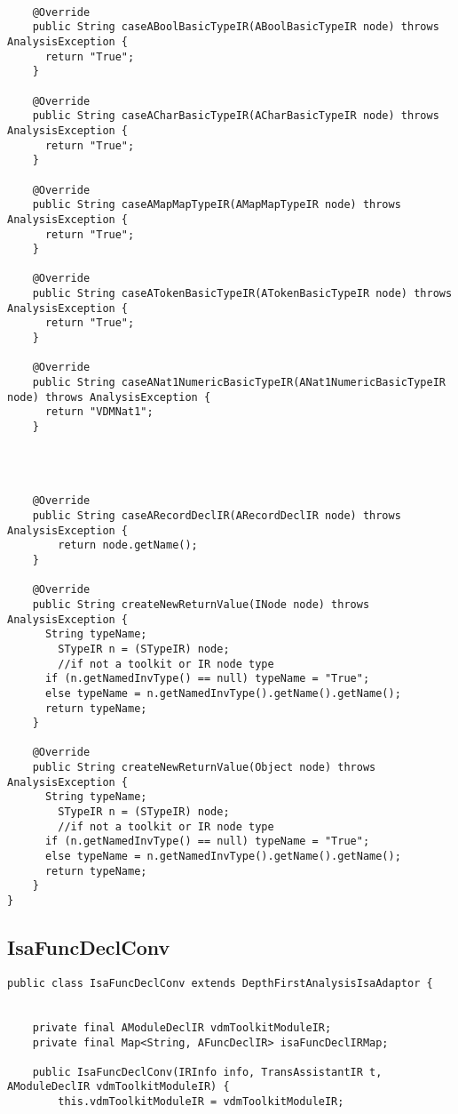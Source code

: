 \begin{appendices}
\begin{lstlisting}
    
    @Override
    public String caseABoolBasicTypeIR(ABoolBasicTypeIR node) throws AnalysisException {
      return "True";
    }
    
    @Override
    public String caseACharBasicTypeIR(ACharBasicTypeIR node) throws AnalysisException {
      return "True";
    }
    
    @Override
    public String caseAMapMapTypeIR(AMapMapTypeIR node) throws AnalysisException {
      return "True";
    }
    
    @Override
    public String caseATokenBasicTypeIR(ATokenBasicTypeIR node) throws AnalysisException {
      return "True";
    }
    
    @Override
    public String caseANat1NumericBasicTypeIR(ANat1NumericBasicTypeIR node) throws AnalysisException {
      return "VDMNat1";
    }
    
    
    
    
    @Override
    public String caseARecordDeclIR(ARecordDeclIR node) throws AnalysisException {
        return node.getName();
    }

    @Override
    public String createNewReturnValue(INode node) throws AnalysisException {
      String typeName;
        STypeIR n = (STypeIR) node;
        //if not a toolkit or IR node type
      if (n.getNamedInvType() == null) typeName = "True";
      else typeName = n.getNamedInvType().getName().getName();
      return typeName;  
    }

    @Override
    public String createNewReturnValue(Object node) throws AnalysisException {
      String typeName;
        STypeIR n = (STypeIR) node;
        //if not a toolkit or IR node type
      if (n.getNamedInvType() == null) typeName = "True";
      else typeName = n.getNamedInvType().getName().getName();
      return typeName;  
    }
}
\end{lstlisting}

\subsection{IsaFuncDeclConv} \label{IsaFuncDeclConv}
\begin{lstlisting}
public class IsaFuncDeclConv extends DepthFirstAnalysisIsaAdaptor {


    private final AModuleDeclIR vdmToolkitModuleIR;
    private final Map<String, AFuncDeclIR> isaFuncDeclIRMap;
    
    public IsaFuncDeclConv(IRInfo info, TransAssistantIR t, AModuleDeclIR vdmToolkitModuleIR) {
        this.vdmToolkitModuleIR = vdmToolkitModuleIR;


\end{lstlisting}
\end{appendices}
